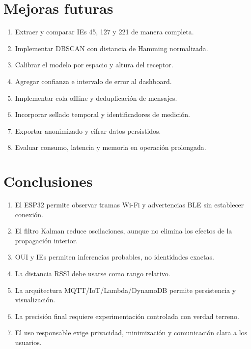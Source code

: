 \documentclass[12pt,a4paper]{article}
\begin{document}
\section{Mejoras futuras}
\begin{enumerate}
\item Extraer y comparar IEs 45, 127 y 221 de manera completa.
\item Implementar DBSCAN con distancia de Hamming normalizada.
\item Calibrar el modelo por espacio y altura del receptor.
\item Agregar confianza e intervalo de error al dashboard.
\item Implementar cola offline y deduplicación de mensajes.
\item Incorporar sellado temporal y identificadores de medición.
\item Exportar anonimizado y cifrar datos persistidos.
\item Evaluar consumo, latencia y memoria en operación prolongada.
\end{enumerate}

\section{Conclusiones}
\begin{enumerate}
\item El ESP32 permite observar tramas Wi-Fi y advertencias BLE sin establecer conexión.
\item El filtro Kalman reduce oscilaciones, aunque no elimina los efectos de la propagación interior.
\item OUI y IEs permiten inferencias probables, no identidades exactas.
\item La distancia RSSI debe usarse como rango relativo.
\item La arquitectura MQTT/IoT/Lambda/DynamoDB permite persistencia y visualización.
\item La precisión final requiere experimentación controlada con verdad terreno.
\item El uso responsable exige privacidad, minimización y comunicación clara a los usuarios.
\end{enumerate}
\end{document}
